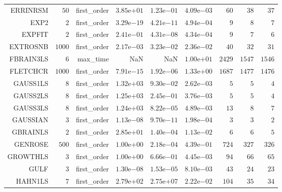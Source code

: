 \begin{longtable}{rrrrrrrrr}
ERRINRSM & \(    50\) & first\_order & \( 3.85\)e\(+01\) & \( 1.23\)e\(-01\) & \( 4.09\)e\(-03\) & \(    60\) & \(    38\) & \(    37\) \\
EXP2 & \(     2\) & first\_order & \( 3.29\)e\(-19\) & \( 4.21\)e\(-11\) & \( 4.94\)e\(-04\) & \(     9\) & \(     8\) & \(     7\) \\
EXPFIT & \(     2\) & first\_order & \( 2.41\)e\(-01\) & \( 4.31\)e\(-08\) & \( 4.34\)e\(-04\) & \(     9\) & \(     7\) & \(     6\) \\
EXTROSNB & \(  1000\) & first\_order & \( 2.17\)e\(-03\) & \( 3.23\)e\(-02\) & \( 2.36\)e\(-02\) & \(    40\) & \(    32\) & \(    31\) \\
FBRAIN3LS & \(     6\) & max\_time &       NaN &       NaN & \( 1.00\)e\(+01\) & \(  2429\) & \(  1547\) & \(  1546\) \\
FLETCHCR & \(  1000\) & first\_order & \( 7.91\)e\(-15\) & \( 1.92\)e\(-06\) & \( 1.33\)e\(+00\) & \(  1687\) & \(  1477\) & \(  1476\) \\
GAUSS1LS & \(     8\) & first\_order & \( 1.32\)e\(+03\) & \( 9.30\)e\(-02\) & \( 2.62\)e\(-03\) & \(     5\) & \(     5\) & \(     4\) \\
GAUSS2LS & \(     8\) & first\_order & \( 1.25\)e\(+03\) & \( 2.45\)e\(-01\) & \( 3.76\)e\(-03\) & \(     5\) & \(     5\) & \(     4\) \\
GAUSS3LS & \(     8\) & first\_order & \( 1.24\)e\(+03\) & \( 8.22\)e\(-05\) & \( 4.89\)e\(-03\) & \(    13\) & \(     8\) & \(     7\) \\
GAUSSIAN & \(     3\) & first\_order & \( 1.13\)e\(-08\) & \( 9.70\)e\(-11\) & \( 1.98\)e\(-04\) & \(     3\) & \(     3\) & \(     2\) \\
GBRAINLS & \(     2\) & first\_order & \( 2.85\)e\(+01\) & \( 1.40\)e\(-04\) & \( 1.13\)e\(-02\) & \(     6\) & \(     6\) & \(     5\) \\
GENROSE & \(   500\) & first\_order & \( 1.00\)e\(+00\) & \( 2.18\)e\(-04\) & \( 4.39\)e\(-01\) & \(   724\) & \(   327\) & \(   326\) \\
GROWTHLS & \(     3\) & first\_order & \( 1.00\)e\(+00\) & \( 6.66\)e\(-01\) & \( 4.45\)e\(-03\) & \(    94\) & \(    66\) & \(    65\) \\
GULF & \(     3\) & first\_order & \( 1.30\)e\(-08\) & \( 1.53\)e\(-05\) & \( 8.10\)e\(-03\) & \(    43\) & \(    24\) & \(    23\) \\
HAHN1LS & \(     7\) & first\_order & \( 2.79\)e\(+02\) & \( 2.75\)e\(+07\) & \( 2.22\)e\(-02\) & \(   104\) & \(    35\) & \(    34\) \\

\end{longtable}
